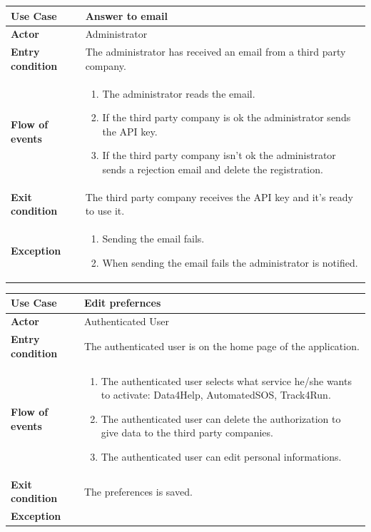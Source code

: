 \documentclass[../main.tex]{subfiles}
\begin{document}
	\begin{center}
		\begin{tabular}{p{3cm}p{8.28cm}}
			\hline
			\textbf{Use Case} & Answer to email\\
			\hline
			\textbf{Actor} & Administrator\\
			\hline
			\textbf{Entry condition} & The administrator has received an email from a third party company.\\
			\hline
			\textbf{Flow of events} & \begin{enumerate}
				\linespread{0}\item The administrator reads the email.
				\linespread{0}\item If the third party company is ok the administrator sends the API key.
				\linespread{0}\item If the third party company isn't ok the administrator sends a rejection email and delete the registration.
			\end{enumerate}\\
			\hline
			\textbf{Exit condition} & The third party company receives the API key and it's ready to use it.\\
			\hline
			\textbf{Exception} & \begin{enumerate}
				\linespread{0}\item Sending the email fails.
				\linespread{0}\item When sending the email fails the administrator is notified.
			\end{enumerate}\\
			\hline
		\end{tabular}
	\end{center}
	\vspace*{3cm}
	\begin{center}
		\begin{tabular}{p{3cm}p{8.28cm}}
			\hline
			\textbf{Use Case} & Edit prefernces\\
			\hline
			\textbf{Actor} & Authenticated User\\
			\hline
			\textbf{Entry condition} & The authenticated user is on the home page of the application.\\
			\hline
			\textbf{Flow of events} & \begin{enumerate}
				\linespread{0}\item The authenticated user selects what service he/she wants to activate: Data4Help, AutomatedSOS, Track4Run.
				\linespread{0}\item The authenticated user can delete the authorization to give data to the third party companies.
				\linespread{0}\item The authenticated user can edit personal informations.
			\end{enumerate}\\
			\hline
			\textbf{Exit condition} & The preferences is saved.\\
			\hline
			\textbf{Exception}\\
			\hline
		\end{tabular}
	\end{center}
\end{document}
